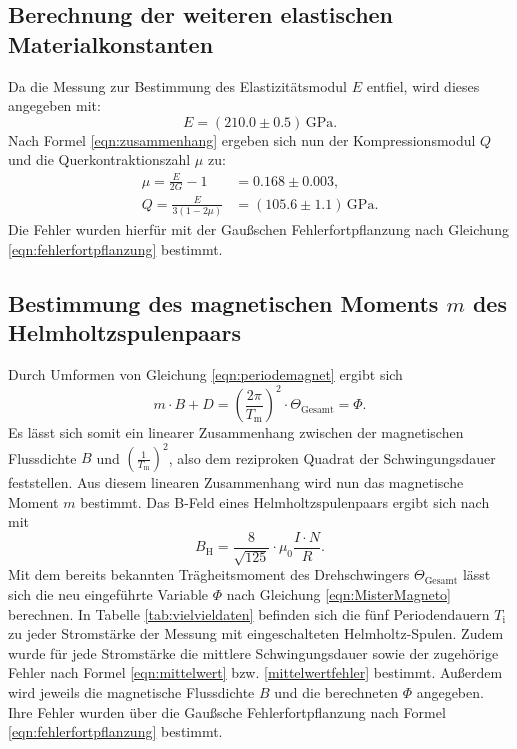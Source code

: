 \subsection{Berechnung der weiteren elastischen Materialkonstanten}
Da die Messung zur Bestimmung des Elastizitätsmodul $E$ entfiel, wird dieses angegeben mit:
\begin{equation*}
	E= (210.0 \pm 0.5 )\,\si{\giga\pascal} \text{.}
\end{equation*}
Nach Formel \eqref{eqn:zusammenhang} ergeben sich nun der Kompressionsmodul $Q$ und die Querkontraktionszahl $\mu$ zu:
\begin{align*}
	\mu  = \frac{E}{2G}-1       & = 0.168\pm 0.003 \mathrm{,}                     \\
	Q    = \frac{E}{3(1-2 \mu)} & = (105.6\pm 1.1) \,\si{\giga\pascal} \mathrm{.}
\end{align*}
Die Fehler wurden hierfür mit der Gaußschen Fehlerfortpflanzung nach Gleichung \eqref{eqn:fehlerfortpflanzung} bestimmt.
\subsection{Bestimmung des magnetischen Moments $m$ des Helmholtzspulenpaars}
Durch Umformen von Gleichung \eqref{eqn:periodemagnet} ergibt sich
\begin{equation*}
	\label{eqn:NeLine}
	m\cdot B+D=\left(\frac{2\pi}{T_\mathrm{m}}\right)^2 \cdot \Theta_{\mathrm{Gesamt}} =\Phi \text{.}
\end{equation*}
Es lässt sich somit ein linearer Zusammenhang zwischen der magnetischen Flussdichte $B$ und $\left(\frac{1}{T_{\mathrm{m}}}\right)^2$, also dem reziproken Quadrat der Schwingungsdauer feststellen.
Aus diesem linearen Zusammenhang wird nun das magnetische Moment $m$ bestimmt.
Das B-Feld eines Helmholtzspulenpaars ergibt sich nach \cite{LordHelmchen} mit
\begin{equation}
	\label{eqn:MisterMagneto}
	B_{\mathrm{H}}= \frac{8}{\sqrt{125}}\cdot \mu_{\mathrm{0}} \frac{I\cdot N}{R} \text{.}
\end{equation}
Mit dem bereits bekannten Trägheitsmoment des Drehschwingers $\Theta_{\mathrm{Gesamt}}$ lässt sich die neu eingeführte Variable $\Phi$ nach Gleichung \eqref{eqn:MisterMagneto} berechnen.
In Tabelle \ref{tab:vielvieldaten} befinden sich die fünf Periodendauern $T_{\mathrm{i}}$ zu jeder Stromstärke der Messung mit eingeschalteten Helmholtz-Spulen.
Zudem wurde für jede Stromstärke die mittlere Schwingungsdauer sowie der zugehörige Fehler nach Formel \eqref{eqn:mittelwert} bzw. \eqref{mittelwertfehler} bestimmt.
Außerdem wird jeweils die magnetische Flussdichte $B$ und die berechneten $\Phi$ angegeben. Ihre Fehler wurden über die Gaußsche Fehlerfortpflanzung nach Formel \eqref{eqn:fehlerfortpflanzung} bestimmt.

